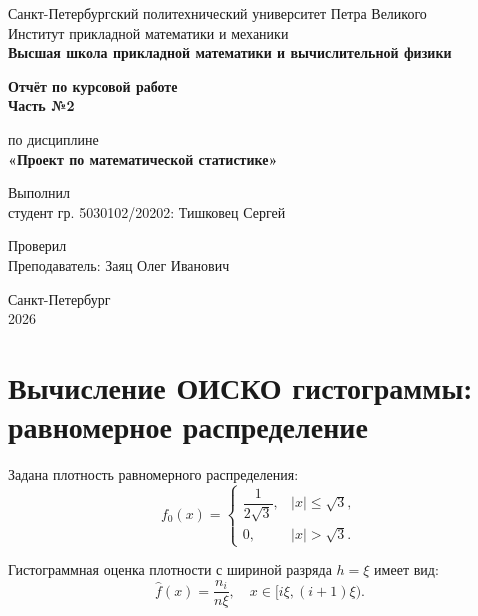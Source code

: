 \documentclass[12pt,a4paper]{article}
\begin{document}

\begin{titlepage}
  \begin{center}
    {Санкт-Петербургский политехнический университет Петра Великого\\
    Институт прикладной математики и механики\\[0.5em]
    \textbf{Высшая школа прикладной математики и вычислительной физики}}
    
    \vfill
    
    {\LARGE\bfseries Отчёт по курсовой работе\\ Часть №2\par}
    \vspace{1em}
    {\Large по дисциплине\\[0.3em] {\bfseries «Проект по математической статистике»}}
    
    \vfill
    
    \begin{flushright}
        Выполнил\\
        студент гр. 5030102/20202: Тишковец Сергей
    \end{flushright}
    
    \begin{flushright}
        Проверил\\
        Преподаватель: Заяц Олег Иванович
    \end{flushright}
    
    \vfill
    Санкт-Петербург\\
    2026
  \end{center}
\end{titlepage}

\setcounter{page}{2}
\newpage

\section*{Вычисление ОИСКО гистограммы: равномерное распределение}

Задана плотность равномерного распределения:
\[
f_0(x) = 
\begin{cases}
\dfrac{1}{2\sqrt{3}}, & |x| \le \sqrt{3}, \\
0, & |x| > \sqrt{3}.
\end{cases}
\]

Гистограммная оценка плотности с шириной разряда $h = \xi$ имеет вид:
\[
\hat{f}(x) = \frac{n_i}{n \xi}, \quad x \in [i\xi, (i+1)\xi).
\]
\end{document}
